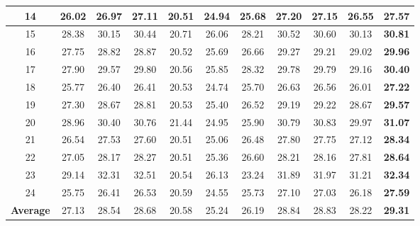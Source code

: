 \documentclass[10pt,onecolumn,letterpaper]{article}
\begin{document}
\begin{table}
\begin{center}
\begin{tabular}{|c||c|c|c|c|c|c|c|c|c|c|}
\\
\hline
14& 26.02 & 26.97 & 27.11 & 20.51 & 24.94  & 25.68 & 27.20 & 27.15 & 26.55 & \textbf{27.57}
\\
\hline
15& 28.38 & 30.15 & 30.44 & 20.71 & 26.06 & 28.21 & 30.52 & 30.60 & 30.13 & \textbf{30.81}
\\
\hline
16& 27.75 & 28.82 & 28.87 & 20.52 & 25.69 & 26.66 & 29.27 & 29.21 & 29.02 & \textbf{29.96}
\\
\hline
17& 27.90 & 29.57 & 29.80 & 20.56 & 25.85 & 28.32 & 29.78 & 29.79 & 29.16 & \textbf{30.40}
\\
\hline
18& 25.77 & 26.40 & 26.41 & 20.53 & 24.74 & 25.70 & 26.63 & 26.56 & 26.01 & \textbf{27.22}
\\
\hline
19& 27.30 & 28.67 & 28.81 & 20.53 & 25.40 & 26.52 & 29.19 & 29.22 & 28.67 & \textbf{29.57}
\\
\hline
20& 28.96 & 30.40 & 30.76 & 21.44 & 24.95 & 25.90 & 30.79 & 30.83 & 29.97 & \textbf{31.07}
\\
\hline
21& 26.54 & 27.53 & 27.60 & 20.51 & 25.06 & 26.48 & 27.80 & 27.75 & 27.12 & \textbf{28.34}
\\
\hline
22& 27.05 & 28.17 & 28.27 & 20.51 & 25.36 & 26.60 & 28.21 & 28.16 & 27.81 & \textbf{28.64}
\\
\hline
23& 29.14 & 32.31 & 32.51 & 20.54 & 26.13 & 23.24 & 31.89 & 31.97 & 31.21 & \textbf{32.34}
\\
\hline
24& 25.75 & 26.41 & 26.53 & 20.59 & 24.55 & 25.73 & 27.10 & 27.03 & 26.18 & \textbf{27.59}
\\
\hline
\textbf{Average} 
& 27.13 & 28.54 & 28.68 & 20.58 & 25.24 & 26.19 & 28.84 & 28.83 & 28.22 & \textbf{29.31}
\\
\hline
\end{tabular}
\end{center}
\end{table}
\end{document}
